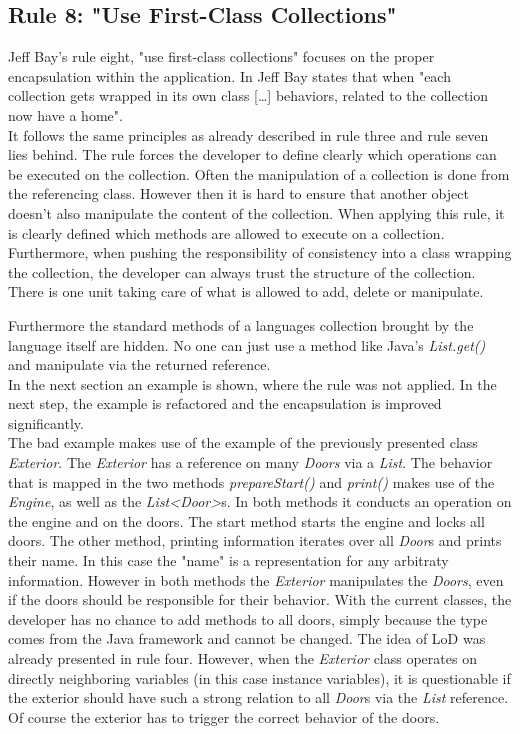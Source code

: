 \subsection*{Rule 8: "Use First-Class Collections"}
Jeff Bay's rule eight, "use first-class collections" focuses on the proper encapsulation within the application. In \cite{oc2008} Jeff Bay states that when "each collection gets wrapped in its own class [\dots{}] behaviors, related to the collection now have a home". 
\\

It follows the same principles as already described in rule three and rule seven lies behind. The rule forces the developer to define clearly which operations can be executed on the collection. Often the manipulation of a collection is done from the referencing class. However then it is hard to ensure that another object doesn't also manipulate the content of the collection. When applying this rule, it is clearly defined which methods are allowed to execute on a collection. Furthermore, when pushing the responsibility of consistency into a class wrapping the collection, the developer can always trust the structure of the collection. There is one unit taking care of what is allowed to add, delete or manipulate. 

Furthermore the standard methods of a languages collection brought by the language itself are hidden. No one can just use a method like Java's \textit{List.get()} and manipulate via the returned reference. 
\\

In the next section an example is shown, where the rule was not applied. In the next step, the example is refactored and the encapsulation is improved significantly. 
\\

The bad example makes use of the example of the previously presented class \textit{Exterior}. The \textit{Exterior} has a reference on many \textit{Doors} via a \textit{List}. The behavior that is mapped in the two methods \textit{prepareStart()} and \textit{print()} makes use of the \textit{Engine}, as well as the \textit{List<Door>}s. In both methods it conducts an operation on the engine and on the doors. The start method starts the engine and locks all doors. The other method, printing information iterates over all \textit{Door}s and prints their name. In this case the "name" is a representation for any arbitraty information. However in both methods the \textit{Exterior} manipulates the \textit{Doors}, even if the doors should be responsible for their behavior. With the current classes, the developer has no chance to add methods to all doors, simply because the type comes from the Java framework and cannot be changed. The idea of \ac{LoD} was already presented in rule four. However, when the \textit{Exterior} class operates on directly neighboring variables (in this case instance variables), it is questionable if the exterior should have such a strong relation to all \textit{Door}s via the \textit{List} reference. Of course the exterior has to trigger the correct behavior of the doors. 
\\

